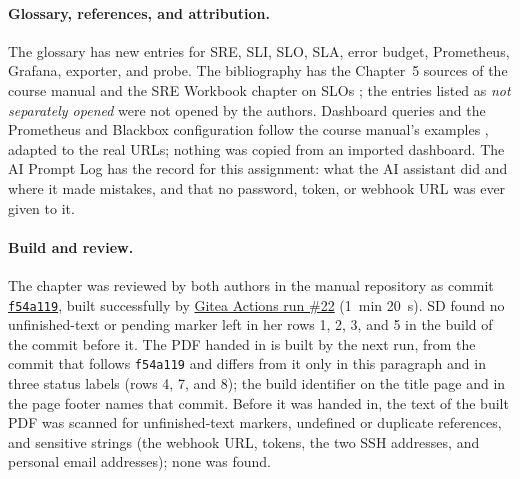 \paragraph{Glossary, references, and attribution.} The glossary has new entries for SRE, SLI, SLO, SLA, error budget, Prometheus, Grafana, exporter, and probe. The bibliography has the Chapter~5 sources of the course manual
\cite{GrafanaPromDataSource,GrafanaAlerting,GrafanaDocker,BlackboxExporter,PrometheusInstall,NodeExporter,PrometheusConfig,PrometheusFunctions} and the SRE Workbook chapter on SLOs \cite{GoogleSREWorkbookSLO}; the entries listed as
\emph{not separately opened} were not opened by the authors. Dashboard queries and the Prometheus and Blackbox configuration follow the course manual's examples \cite{DosManual}, adapted to the real URLs; nothing was copied from an imported dashboard.
The AI Prompt Log has the record for this assignment: what the AI assistant did and where it made mistakes, and that no password, token, or webhook URL was ever given to it.

\paragraph{Build and review.} The chapter was reviewed by both authors in the manual repository as commit
\href{\GiteaURL/group1-startup/manual/commit/f54a119}{\texttt{f54a119}}, built successfully by
\href{\GiteaURL/group1-startup/manual/actions/runs/22}{Gitea Actions run \#22} (1~min 20~s). SD found no unfinished-text or pending marker left in her rows 1, 2, 3, and 5 in the build of the commit before it. The PDF handed in is
built by the next run, from the commit that follows \texttt{f54a119} and differs from it only in this paragraph and in three status labels (rows 4, 7, and 8); the build identifier on the title page and in the page footer names that commit.
Before it was handed in, the text of the built PDF was scanned for unfinished-text markers, undefined or duplicate references, and sensitive strings (the webhook URL, tokens, the two SSH addresses, and personal email addresses); none was found.


